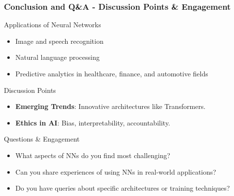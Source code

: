 \documentclass[aspectratio=169]{beamer}
\begin{document}
\begin{frame}[fragile]
    \frametitle{Conclusion and Q\&A - Discussion Points & Engagement}
    \begin{block}{Applications of Neural Networks}
        \begin{itemize}
            \item Image and speech recognition
            \item Natural language processing
            \item Predictive analytics in healthcare, finance, and automotive fields
        \end{itemize}
    \end{block}
    
    \begin{block}{Discussion Points}
        \begin{itemize}
            \item \textbf{Emerging Trends}: Innovative architectures like Transformers.
            \item \textbf{Ethics in AI}: Bias, interpretability, accountability.
        \end{itemize}
    \end{block}

    \begin{block}{Questions \& Engagement}
        \begin{itemize}
            \item What aspects of NNs do you find most challenging?
            \item Can you share experiences of using NNs in real-world applications?
            \item Do you have queries about specific architectures or training techniques?
        \end{itemize}
    \end{block}
\end{frame}
\end{document}
